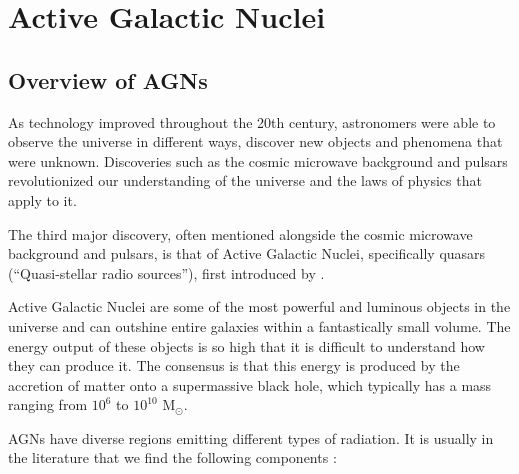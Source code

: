\chapter{Active Galactic Nuclei}
\label{chap:Active Galactic Nuclei}
\section{Overview of AGNs}
As technology improved throughout the 20th century, astronomers were able to observe the universe in different ways, discover new objects and phenomena that were unknown. Discoveries such as the cosmic microwave background and pulsars revolutionized our understanding of the universe and the laws of physics that apply to it.

The third major discovery, often mentioned alongside the cosmic microwave background and pulsars, is that of Active Galactic Nuclei, specifically quasars (``Quasi-stellar radio sources''), first introduced by \citet{10.1063/1.3051610}.

Active Galactic Nuclei are some of the most powerful and luminous objects in the universe and can outshine entire galaxies within a fantastically small volume. The energy output of these objects is so high that it is difficult to understand how they can produce it. The consensus is that this energy is produced by the accretion of matter onto a supermassive black hole, which typically has a mass ranging from $10^6$ to $10^{10}$ $\text{M}_\odot$.

AGNs have diverse regions emitting different types of radiation. It is usually in the literature that we find the following components \citep{RadiativeProcesses}:

